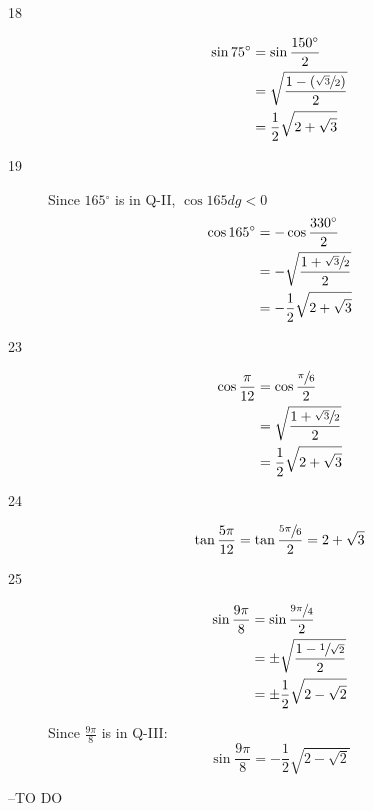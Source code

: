 \documentclass{exam}
\newcommand{\dg}{\ensuremath{^\circ}}
\begin{document}
\begin{description}
      \item[18]
        \begin{align*}
          \sin 75 \dg & = \sin \frac{150 \dg}{2} \\
                      & = \sqrt{ \frac{1 - (\sfrac{\sqrt{3}}{2})}{2} } \\
                      & = \frac{1}{2} \sqrt{2 + \sqrt{3}} \\
        \end{align*}

      \item[19]
        Since $165 \dg$ is in Q-II, $\cos 165 dg < 0$
        \begin{align*}
          \cos 165 \dg & = - \cos \frac{330 \dg}{2}  \\
                       & = - \sqrt{ \frac{1 + \sfrac{\sqrt{3}}{2}}{2} } \\
                       & = - \frac{1}{2} \sqrt{ 2 + \sqrt{3} } \\
        \end{align*}

      \item[23]
        \begin{align*}
          \cos \frac{\pi}{12} & = \cos \frac{\sfrac{\pi}{6}}{2} \\
                              & = \sqrt{ \frac{1 + \sfrac{\sqrt{3}}{2}} {2} } \\
                              & = \frac{1}{2} \sqrt{2 + \sqrt{3}} \\
        \end{align*}

      \item[24]
        \[
          \tan \frac{5 \pi}{12} = \tan \frac{\sfrac{5 \pi}{6}}{2} = 2 + \sqrt{3}
        \]

      \item[25]
        \begin{align*}
          \sin \frac{9 \pi}{8} & = \sin \frac{\sfrac{9 \pi}{4}}{2} \\
                               & = \pm \sqrt{ \frac{1 - \sfrac{1}{\sqrt{2}}}{2} } \\
                               & = \pm \frac{1}{2} \sqrt{ 2 - \sqrt{2} } \\
        \end{align*}

        Since $\frac{9 \pi}{8}$ is in Q-III:
        \[
          \sin \frac{9 \pi}{8} = - \frac{1}{2} \sqrt{ 2 - \sqrt{2} } 
        \]

    \end{description}

  \else
    \vspace{5 cm}

    \begin{quote}
      \begin{em}
      \end{em}
    \end{quote}
    \hspace{1 cm} --TO DO
  \fi
\end{document}
